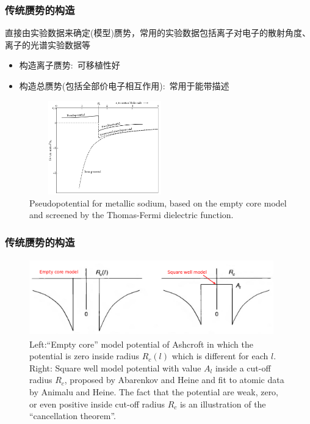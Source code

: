 {\frame
{
	\frametitle{传统赝势的构造}
	直接由实验数据来确定(模型)赝势，常用的实验数据包括离子对电子的散射角度、离子的光谱实验数据等
		\begin{itemize}
			\item 构造离子赝势:~可移植性好
			\item 构造总赝势(包括全部价电子相互作用):~常用于能带描述
		\end{itemize}
\begin{figure}[h!]
\centering
\vspace*{-0.10in}
\includegraphics[height=1.60in,width=2.57in,viewport=0 0 980 600,clip]{Figures/Pseudo-model-empty_core.png}
\caption{\tiny \textrm{Pseudopotential for metallic sodium, based on the empty core model and screened by the Thomas-Fermi dielectric function.}}%
\label{Pseudo_model-empty_core}
\end{figure}
}

\frame
{
	\frametitle{传统赝势的构造}
\begin{figure}[h!]
\centering
\vspace*{-0.10in}
\includegraphics[height=1.30in,width=4.17in,viewport=0 0 1150 350,clip]{Figures/Pseudo-model.png}
\caption{\tiny \textrm{Left:``Empty core'' model potential of Ashcroft in which the potential is zero inside radius $R_c(l)$ which is different for each $l$. Right: Square well model potential with value $A_l$ inside a cut-off radius $R_c$, proposed by Abarenkov and Heine and fit to atomic data by Animalu and Heine. The fact that the potential are weak, zero, or even positive inside cut-off radius $R_c$ is an illustration of the ``cancellation theorem''.}}%
\label{Pseudo-model}
\end{figure}
}

}
